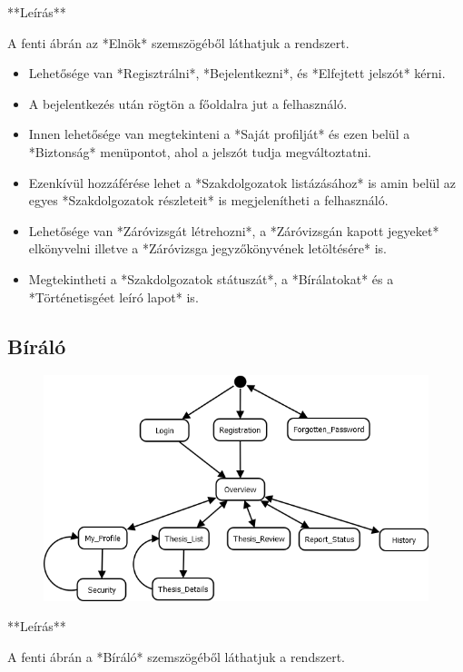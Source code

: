 \documentclass[a4paper,12pt]{article}
\begin{document}
**Leírás**

A fenti ábrán az *Elnök* szemszögéből láthatjuk a rendszert. 
\begin{itemize}
	\item Lehetősége van *Regisztrálni*, *Bejelentkezni*, és *Elfejtett jelszót* kérni. 
	\item A bejelentkezés után rögtön a főoldalra jut a felhasználó. 
	\item Innen lehetősége van megtekinteni a *Saját profilját* és ezen belül a *Biztonság* menüpontot, ahol a jelszót tudja megváltoztatni. 
	\item Ezenkívül hozzáférése lehet a *Szakdolgozatok listázásához* is amin belül az egyes *Szakdolgozatok részleteit* is megjelenítheti a felhasználó. 
	\item Lehetősége van *Záróvizsgát létrehozni*, a *Záróvizsgán kapott jegyeket* elkönyvelni illetve a *Záróvizsga jegyzőkönyvének letöltésére* is. 
	\item Megtekintheti a *Szakdolgozatok státuszát*, a *Bírálatokat* és a *Történetisgéet leíró lapot* is.
\end{itemize}

\subsection{Bíráló}

\begin{figure}
	\centering
	\includegraphics[width=\textwidth]{images/Lapok_kozotti_atmenetek/Biralo.png}
	\caption{}
	\label{fig:Biralo}
\end{figure}

**Leírás**

A fenti ábrán a *Bíráló* szemszögéből láthatjuk a rendszert. 
\end{document}
